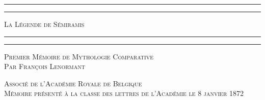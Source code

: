 \documentclass[a4paper, 11pt, oneside, landscape]{article}
\begin{document}
\bfseries
{}
\renewcommand\thefootnote{{\bfseries\color{White}{\arabic{footnote}}}}
\let\oldfootnote\footnote
    \renewcommand{\footnote}[1]{\oldfootnote{{\bfseries\color{White}#1}}}
\begin{titlepage} %
	\centering %

	
	\rule{\textwidth}{1.6pt}\vspace*{-\baselineskip}\vspace*{2pt} %
	\rule{\textwidth}{0.4pt} %
	
	\vspace{0.3\baselineskip} %
	
	{\scshape\Large La Légende de Sémiramis}
	
	\vspace{0.1\baselineskip} %

	\rule{\textwidth}{0.4pt}\vspace*{-\baselineskip}\vspace{3.2pt} %
	\rule{\textwidth}{1.6pt} %
	
	\vspace{0.1\baselineskip} %
	
	
	{\scshape \footnotesize Premier Mémoire de Mythologie Comparative 	\vspace{0.2\baselineskip}\\\normalsize Par François Lenormant} %
	
	\vspace*{0.3\baselineskip} %
	
        {\scshape\footnotesize Associé de l'Académie Royale de Belgique\\\small Mémoire présenté à la classe des lettres de l'Académie le 8 janvier 1872} %
    
        \vspace*{\fill}


\end{titlepage}
\end{document}
